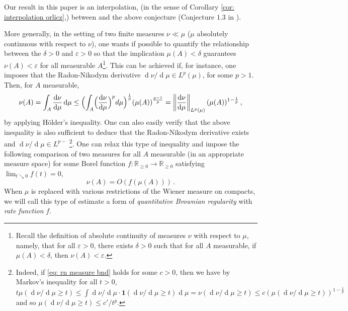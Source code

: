 \documentclass[11pt, reqno]{amsart}
\numberwithin{equation}{section}
\newcommand{\R}{\ensuremath{\mathbb{R}}}
\newcommand{\diff}{\ensuremath{\operatorname{d}\!}}
\begin{document}
Our result in this paper is an interpolation, (in the sense of Corollary \ref{cor: interpolation orlicz},) between \cite[Theorem 1.2]{sarkar2021brownian} and the above conjecture (Conjecture $1.3$ in \cite{hammond2019patchwork}).

More generally, in the setting of two finite measures $\nu\ll\mu$ ($\mu$ absolutely continuous with respect to $\nu$), one wants if possible to quantify the relationship between the $\delta>0$ and $\varepsilon>0$ so that the implication $\mu(A)<\delta$ guarantees $\nu(A)<\varepsilon$ for all measurable $A$\footnote{Recall the definition of absolute continuity of measures $\nu$ with respect to $\mu$, namely, that for all $\varepsilon>0$, there exists $\delta>0$ such that for all $A$ measurable, if $\mu(A)<\delta$, then $\nu(A)<\varepsilon$.}. This can be achieved if, for instance, one imposes that the Radon-Nikodym derivative $\diff\nu/\diff\mu\in L^p (
\mu)$, for some $p>1$. Then, for $A$ measurable, 
\begin{equation}\label{eq: rn measure bnd}
\nu(A) = \displaystyle \int_{A}\frac{\diff\nu}{\diff\mu}\diff\mu
\leq \Bigl(\int_{A}\Bigl(\frac{\diff\nu}{\diff\mu}\Bigr)^pd\mu\Bigr)^{\frac{1}{p}}(\mu(A))^{\frac{p-1}{p}}
= \left\lVert\frac{\diff\nu}{\diff\mu}\right\rVert_{L^p(\mu)}(\mu(A))^{1-\frac{1}{p}} \,,
\end{equation}
by applying H\"{o}lder's inequality. One can also easily verify that the above inequality is also sufficient to deduce that the Radon-Nikodym derivative exists and $\diff\nu/\diff\mu\in L^{p-}$ \footnote{Indeed, if \eqref{eq: rn measure bnd} holds for some $c> 0$, then we have by Markov's inequality for all $t> 0$, $t\mu(\diff\nu/\diff \mu \ge t)\le \int\diff\nu/\diff \mu\cdot \mathbf{1}(\diff\nu/\diff \mu\ge t)\diff \mu= \nu(\diff\nu/\diff \mu\ge t)\le c(\mu(\diff\nu/\diff \mu\ge t))^{1-\frac{1}{p}}$ and so $\mu(\diff\nu/\diff \mu \ge t)\le c'/t^p$. }. One can relax this type of inequality and impose the following comparison of two measures for all $A$ measurable (in an appropriate measure space) for some Borel function $f:\R_{\ge 0}\to \R_{\ge 0}$ satisfying $\lim_{t \searrow 0}f(t) = 0$, 
\begin{equation}\label{eq: quantitative br reg}
\nu(A) = O(f(\mu(A)))\,.
\end{equation}
When $\mu$ is replaced with various restrictions of the Wiener measure on compacts, we will call this type of estimate a form of \emph{quantitative Brownian regularity} with \emph{rate function} $f$.
\end{document}
